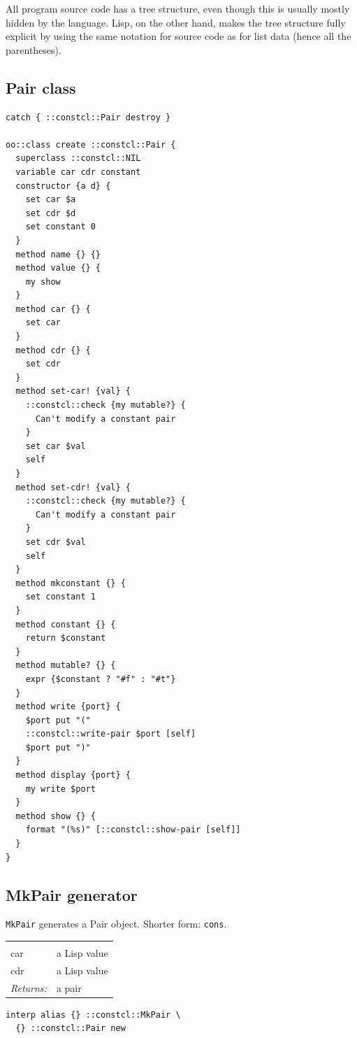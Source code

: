 \documentclass[twoside,9pt]{report}
\begin{document}
All program source code has a tree structure, even though this is usually mostly hidden by the language. Lisp, on the other hand, makes the tree structure fully explicit by using the same notation for source code as for list data (hence all the parentheses).

\subsection{Pair class}
\label{pair-class}
\begin{lstlisting}
catch { ::constcl::Pair destroy }

oo::class create ::constcl::Pair {
  superclass ::constcl::NIL
  variable car cdr constant
  constructor {a d} {
    set car $a
    set cdr $d
    set constant 0
  }
  method name {} {}
  method value {} {
    my show
  }
  method car {} {
    set car
  }
  method cdr {} {
    set cdr
  }
  method set-car! {val} {
    ::constcl::check {my mutable?} {
      Can't modify a constant pair
    }
    set car $val
    self
  }
  method set-cdr! {val} {
    ::constcl::check {my mutable?} {
      Can't modify a constant pair
    }
    set cdr $val
    self
  }
  method mkconstant {} {
    set constant 1
  }
  method constant {} {
    return $constant
  }
  method mutable? {} {
    expr {$constant ? "#f" : "#t"}
  }
  method write {port} {
    $port put "("
    ::constcl::write-pair $port [self]
    $port put ")"
  }
  method display {port} {
    my write $port
  }
  method show {} {
    format "(%s)" [::constcl::show-pair [self]]
  }
}
\end{lstlisting}
\subsection{MkPair generator}
\label{mkpair-generator}


\texttt{MkPair} generates a Pair object. Shorter form: \texttt{cons}.

\noindent\begin{tabular}{ |p{1.9cm} p{8cm}| }
\hline
\rowcolor[HTML]{CCCCCC} \multicolumn{2}{|l|}{\bf MkPair (internal)} \\
car & a Lisp value \\
cdr & a Lisp value \\
\textit{Returns:} & a pair \\
\hline
\end{tabular}
\begin{lstlisting}
interp alias {} ::constcl::MkPair \
  {} ::constcl::Pair new
\end{lstlisting}
\end{document}
